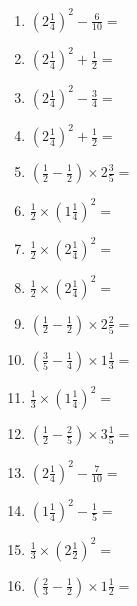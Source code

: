 \documentclass[12pt]{article}
\begin{document}
\begin{enumerate}
\item \large $ \left( 2 \frac{1}{4} \right)^2 - \frac{6}{10} = $ \vspace{1.6cm}
\item \large $ \left( 2 \frac{1}{4} \right)^2 + \frac{1}{2} = $ \vspace{1.6cm}
\item \large $ \left( 2 \frac{1}{4} \right)^2 - \frac{3}{4} = $ \vspace{1.6cm}
\item \large $ \left( 2 \frac{1}{4} \right)^2 + \frac{1}{2} = $ \vspace{1.6cm}
\item \large $ \left( \frac{1}{2} - \frac{1}{2} \right) \times 2 \frac{3}{5} = $ \vspace{1.6cm}
\newpage
\item \large $ \frac{1}{2} \times \left( 1 \frac{1}{4} \right)^2 = $ \vspace{1.6cm}
\item \large $ \frac{1}{2} \times \left( 2 \frac{1}{4} \right)^2 = $ \vspace{1.6cm}
\item \large $ \frac{1}{2} \times \left( 2 \frac{1}{4} \right)^2 = $ \vspace{1.6cm}
\item \large $ \left( \frac{1}{2} - \frac{1}{2} \right) \times 2 \frac{2}{5} = $ \vspace{1.6cm}
\item \large $ \left( \frac{3}{5} - \frac{1}{4} \right) \times 1 \frac{1}{3} = $ \vspace{1.6cm}
\item \large $ \frac{1}{3} \times \left( 1 \frac{1}{4} \right)^2 = $ \vspace{1.6cm}
\item \large $ \left( \frac{1}{2} - \frac{2}{5} \right) \times 3 \frac{1}{5} = $ \vspace{1.6cm}
\item \large $ \left( 2 \frac{1}{4} \right)^2 - \frac{7}{10} = $ \vspace{1.6cm}
\item \large $ \left( 1 \frac{1}{4} \right)^2 - \frac{1}{5} = $ \vspace{1.6cm}
\item \large $ \frac{1}{3} \times \left( 2 \frac{1}{2} \right)^2 = $ \vspace{1.6cm}
\newpage
\item \large $ \left( \frac{2}{3} - \frac{1}{2} \right) \times 1 \frac{1}{2} = $ \vspace{1.6cm}

\end{enumerate}
\end{document}
